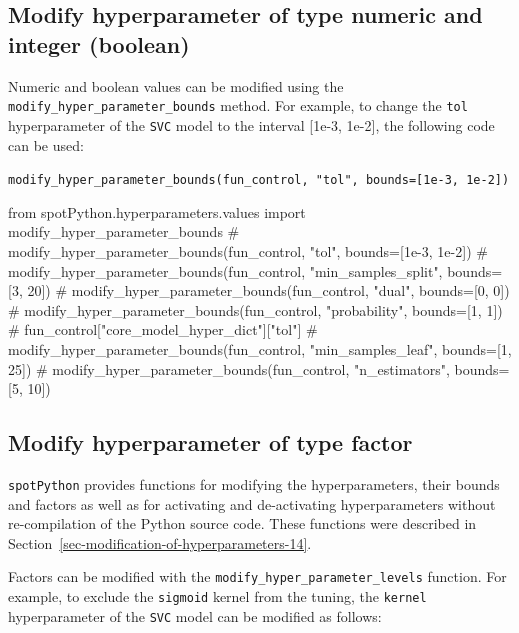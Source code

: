 \documentclass[
  letterpaper,
  DIV=11,
  numbers=noendperiod]{scrreprt}
\newenvironment{Shaded}{\begin{snugshade}}{\end{snugshade}}
\newcommand{\CommentTok}[1]{\textcolor[rgb]{0.37,0.37,0.37}{#1}}
\newcommand{\ImportTok}[1]{\textcolor[rgb]{0.00,0.46,0.62}{#1}}
\newcommand{\NormalTok}[1]{\textcolor[rgb]{0.00,0.23,0.31}{#1}}
\begin{document}
\hypertarget{modify-hyperparameter-of-type-numeric-and-integer-boolean-2}{%
\subsection{Modify hyperparameter of type numeric and integer
(boolean)}\label{modify-hyperparameter-of-type-numeric-and-integer-boolean-2}}

Numeric and boolean values can be modified using the
\texttt{modify\_hyper\_parameter\_bounds} method. For example, to change
the \texttt{tol} hyperparameter of the \texttt{SVC} model to the
interval {[}1e-3, 1e-2{]}, the following code can be used:

\texttt{modify\_hyper\_parameter\_bounds(fun\_control,\ "tol",\ bounds={[}1e-3,\ 1e-2{]})}

\begin{Shaded}
\begin{Highlighting}[]
\ImportTok{from}\NormalTok{ spotPython.hyperparameters.values }\ImportTok{import}\NormalTok{ modify\_hyper\_parameter\_bounds}
\CommentTok{\# modify\_hyper\_parameter\_bounds(fun\_control, "tol", bounds=[1e{-}3, 1e{-}2])}
\CommentTok{\# modify\_hyper\_parameter\_bounds(fun\_control, "min\_samples\_split", bounds=[3, 20])}
\CommentTok{\# modify\_hyper\_parameter\_bounds(fun\_control, "dual", bounds=[0, 0])}
\CommentTok{\# modify\_hyper\_parameter\_bounds(fun\_control, "probability", bounds=[1, 1])}
\CommentTok{\# fun\_control["core\_model\_hyper\_dict"]["tol"]}
\CommentTok{\# modify\_hyper\_parameter\_bounds(fun\_control, "min\_samples\_leaf", bounds=[1, 25])}
\CommentTok{\# modify\_hyper\_parameter\_bounds(fun\_control, "n\_estimators", bounds=[5, 10])}
\end{Highlighting}
\end{Shaded}

\hypertarget{modify-hyperparameter-of-type-factor-3}{%
\subsection{Modify hyperparameter of type
factor}\label{modify-hyperparameter-of-type-factor-3}}

\texttt{spotPython} provides functions for modifying the
hyperparameters, their bounds and factors as well as for activating and
de-activating hyperparameters without re-compilation of the Python
source code. These functions were described in
Section~\ref{sec-modification-of-hyperparameters-14}.

Factors can be modified with the
\texttt{modify\_hyper\_parameter\_levels} function. For example, to
exclude the \texttt{sigmoid} kernel from the tuning, the \texttt{kernel}
hyperparameter of the \texttt{SVC} model can be modified as follows:
\end{document}
